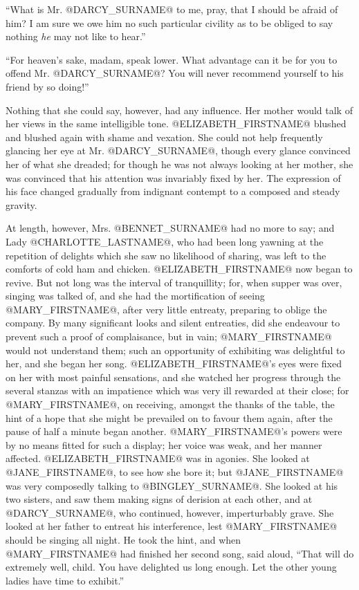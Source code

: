``What is Mr. @DARCY_SURNAME@ to me, pray, that I should be afraid of him? I am
sure we owe him no such particular civility as to be obliged to say
nothing \textit{he} may not like to hear.''

``For heaven's sake, madam, speak lower. What advantage can it be for you
to offend Mr. @DARCY_SURNAME@? You will never recommend yourself to his friend by
so doing!''

Nothing that she could say, however, had any influence. Her mother would
talk of her views in the same intelligible tone. @ELIZABETH_FIRSTNAME@ blushed and
blushed again with shame and vexation. She could not help frequently
glancing her eye at Mr. @DARCY_SURNAME@, though every glance convinced her of what
she dreaded; for though he was not always looking at her mother, she was
convinced that his attention was invariably fixed by her. The expression
of his face changed gradually from indignant contempt to a composed and
steady gravity.

At length, however, Mrs. @BENNET_SURNAME@ had no more to say; and Lady @CHARLOTTE_LASTNAME@, who
had been long yawning at the repetition of delights which she saw no
likelihood of sharing, was left to the comforts of cold ham and
chicken. @ELIZABETH_FIRSTNAME@ now began to revive. But not long was the interval of
tranquillity; for, when supper was over, singing was talked of, and
she had the mortification of seeing @MARY_FIRSTNAME@, after very little entreaty,
preparing to oblige the company. By many significant looks and silent
entreaties, did she endeavour to prevent such a proof of complaisance,
but in vain; @MARY_FIRSTNAME@ would not understand them; such an opportunity of
exhibiting was delightful to her, and she began her song. @ELIZABETH_FIRSTNAME@'s
eyes were fixed on her with most painful sensations, and she watched her
progress through the several stanzas with an impatience which was very
ill rewarded at their close; for @MARY_FIRSTNAME@, on receiving, amongst the thanks
of the table, the hint of a hope that she might be prevailed on to
favour them again, after the pause of half a minute began another.
@MARY_FIRSTNAME@'s powers were by no means fitted for such a display; her voice was
weak, and her manner affected. @ELIZABETH_FIRSTNAME@ was in agonies. She looked at
@JANE_FIRSTNAME@, to see how she bore it; but @JANE_FIRSTNAME@ was very composedly talking to
@BINGLEY_SURNAME@. She looked at his two sisters, and saw them making signs
of derision at each other, and at @DARCY_SURNAME@, who continued, however,
imperturbably grave. She looked at her father to entreat his
interference, lest @MARY_FIRSTNAME@ should be singing all night. He took the hint,
and when @MARY_FIRSTNAME@ had finished her second song, said aloud, ``That will do
extremely well, child. You have delighted us long enough. Let the other
young ladies have time to exhibit.''

